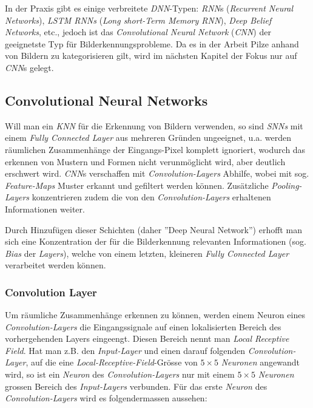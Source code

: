 In der Praxis gibt es einige verbreitete \textit{DNN}-Typen: \textit{RNN}s (\textit{Recurrent Neural Networks}), \textit{LSTM RNNs} (\textit{Long short-Term Memory RNN}), \textit{Deep Belief Networks}, etc., jedoch ist das \textit{Convolutional Neural Network} (\textit{CNN}) der geeignetste Typ für Bilderkennungsprobleme. Da es in der Arbeit Pilze anhand von Bildern zu kategorisieren gilt, wird im nächsten Kapitel der Fokus nur auf \textit{CNN}s gelegt.

\subsection{Convolutional Neural Networks}\label{cha:theo:cnn}
Will man ein \textit{KNN} für die Erkennung von Bildern verwenden, so sind \textit{SNNs} mit einem \textit{Fully Connected Layer} aus mehreren Gründen ungeeignet, u.a. werden räumlichen Zusammenhänge der Eingangs-Pixel komplett ignoriert, wodurch das erkennen von Mustern und Formen nicht verunmöglicht wird, aber deutlich erschwert wird. \textit{CNN}s verschaffen mit \textit{Convolution-Layers} Abhilfe, wobei mit sog. \textit{Feature-Maps} Muster erkannt und gefiltert werden können. Zusätzliche \textit{Pooling-Layers} konzentrieren zudem die von den \textit{Convolution-Layers} erhaltenen Informationen weiter.

Durch Hinzufügen dieser Schichten (daher ''Deep Neural Network'') erhofft man sich eine Konzentration der für die Bilderkennung relevanten Informationen (sog. \textit{Bias} der \textit{Layers}), welche von einem letzten, kleineren \textit{Fully Connected Layer} verarbeitet werden können.

\subsubsection{Convolution Layer}
Um räumliche Zusammenhänge erkennen zu können, werden einem Neuron eines \textit{Convolution-Layers} die Eingangssignale auf einen lokalisierten Bereich des vorhergehenden Layers eingeengt. Diesen Bereich nennt man \textit{Local Receptive Field}. Hat man z.B. den \textit{Input-Layer} und einen darauf folgenden \textit{Convolution-Layer}, auf die eine \textit{Local-Receptive-Field}-Grösse von $5\times 5$ \textit{Neuronen} angewandt wird, so ist ein \textit{Neuron} des \textit{Convolution-Layers} nur mit einem $5\times 5$ \textit{Neuronen} grossen Bereich des \textit{Input-Layers} verbunden. Für das erste \textit{Neuron} des \textit{Convolution-Layers} wird es folgendermassen aussehen:


